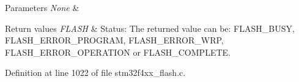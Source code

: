 \begin{DoxyParams}{Parameters}
{\em None} & \\
\hline
\end{DoxyParams}

\begin{DoxyRetVals}{Return values}
{\em F\-L\-A\-S\-H} & Status\-: The returned value can be\-: F\-L\-A\-S\-H\-\_\-\-B\-U\-S\-Y, F\-L\-A\-S\-H\-\_\-\-E\-R\-R\-O\-R\-\_\-\-P\-R\-O\-G\-R\-A\-M, F\-L\-A\-S\-H\-\_\-\-E\-R\-R\-O\-R\-\_\-\-W\-R\-P, F\-L\-A\-S\-H\-\_\-\-E\-R\-R\-O\-R\-\_\-\-O\-P\-E\-R\-A\-T\-I\-O\-N or F\-L\-A\-S\-H\-\_\-\-C\-O\-M\-P\-L\-E\-T\-E. \\
\hline
\end{DoxyRetVals}


Definition at line 1022 of file stm32f4xx\-\_\-flash.\-c.

